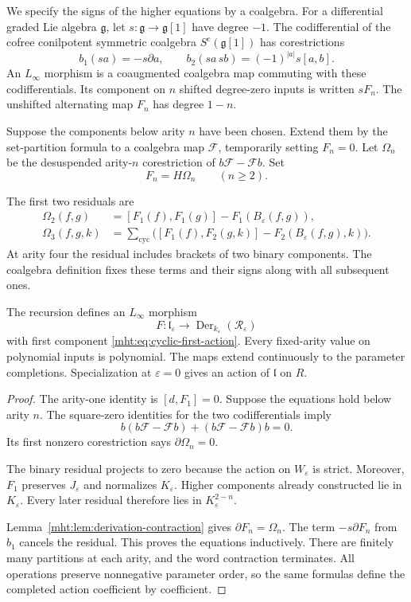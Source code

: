 We specify the signs of the higher equations by a coalgebra.
For a differential graded Lie algebra $\mathfrak g$, let
$s:\mathfrak g\to\mathfrak g[1]$ have degree $-1$.
The codifferential of the cofree conilpotent symmetric coalgebra
$S^c(\mathfrak g[1])$ has corestrictions
\[
 b_1(sa)=-s\partial a,
 \qquad b_2(sa\,sb)=(-1)^{|a|}s[a,b].
\]
An $L_\infty$ morphism is a coaugmented coalgebra map commuting
with these codifferentials. Its component on $n$ shifted
degree-zero inputs is written $sF_n$. The unshifted alternating
map $F_n$ has degree $1-n$.

Suppose the components below arity $n$ have been chosen. Extend
them by the set-partition formula to a coalgebra map
$\mathcal F$, temporarily setting $F_n=0$. Let $\Omega_n$
be the desuspended arity-$n$ corestriction of
$b\mathcal F-\mathcal F b$. Set
\begin{equation}\label{mht:eq:all-arity-recursion}
 F_n=H\Omega_n\qquad(n\geq2).
\end{equation}

The first two residuals are
\begin{align*}
 \Omega_2(f,g)&=[F_1(f),F_1(g)]-F_1(B_\varepsilon(f,g)),\\
 \Omega_3(f,g,k)&=\sum_{\mathrm{cyc}}
   \bigl([F_1(f),F_2(g,k)]-F_2(B_\varepsilon(f,g),k)\bigr).
\end{align*}
At arity four the residual includes brackets of two binary
components. The coalgebra definition fixes these terms and their
signs along with all subsequent ones.

\begin{theorem}\label{mht:thm:coherent-hamiltonian-action}
The recursion defines an $L_\infty$ morphism
\[
 F:\mathfrak l_\varepsilon
   \longrightarrow
   \operatorname{Der}_{k_\varepsilon}(\mathcal R_\varepsilon)
\]
with first component \eqref{mht:eq:cyclic-first-action}.
Every fixed-arity value on polynomial inputs is polynomial.
The maps extend continuously to the parameter completions.
Specialization at $\varepsilon=0$ gives an action of
$\mathfrak l$ on $R$.
\end{theorem}

\begin{proof}
The arity-one identity is $[d,F_1]=0$. Suppose the equations
hold below arity $n$. The square-zero identities for the two
codifferentials imply
\[
 b(b\mathcal F-\mathcal F b)
 +(b\mathcal F-\mathcal F b)b=0.
\]
Its first nonzero corestriction says $\partial\Omega_n=0$.

The binary residual projects to zero because the action on
$W_\varepsilon$ is strict. Moreover, $F_1$ preserves
$J_\varepsilon$ and normalizes $K_\varepsilon$.
Higher components already constructed lie in $K_\varepsilon$.
Every later residual therefore lies in $K_\varepsilon^{2-n}$.

Lemma~\ref{mht:lem:derivation-contraction} gives
$\partial F_n=\Omega_n$. The term $-s\partial F_n$ from $b_1$
cancels the residual. This proves the equations inductively.
There are finitely many partitions at each arity, and the word
contraction terminates. All operations preserve nonnegative
parameter order, so the same formulas define the completed action
coefficient by coefficient.
\end{proof}

